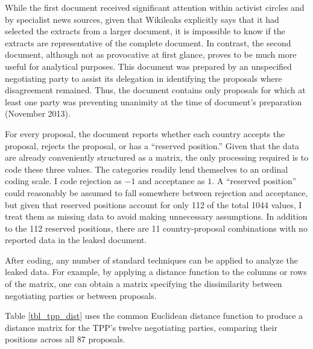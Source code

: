 \documentclass[12pt]{article}
\begin{document}
While the first document received significant 
attention within activist circles and by specialist news sources, given that Wikileaks 
explicitly says that it had selected the extracts from a larger document, it is impossible to know if the  
extracts are representative of the complete document. In contrast, the second document, although 
not as provocative at first glance, proves to be much more useful for 
analytical purposes. This document was prepared by an unspecified 
negotiating party to assist its delegation in identifying the proposals where disagreement remained. 
Thus, the document contains only proposals for which at least one party was preventing unanimity at 
the time of document's preparation (November 2013).

For every proposal, the document reports whether each country accepts the proposal, rejects the 
proposal, 
or has a ``reserved position.''	Given that the data are already conveniently structured as a matrix, 
the only processing required is to code these three values. The categories 
readily lend themselves to an ordinal coding scale. I code rejection as $-1$ and acceptance as 
$1$. A ``reserved position'' could reasonably be assumed to fall somewhere between rejection and acceptance, 
but given that reserved positions account for only 112 of the total 1044 values, I treat them as 
missing data to avoid making unnecessary assumptions. In addition to the 112 reserved positions, 
there are 11 country-proposal combinations with no reported data in the leaked document.

After coding, any number of standard techniques can be applied 
to analyze the leaked data. For example, by applying a distance function to the columns or rows of 
the matrix, one can obtain a matrix specifying the dissimilarity between negotiating 
parties or between proposals. 

Table \ref{tbl_tpp_dist} uses the common Euclidean distance function 
to produce a distance matrix for the TPP's twelve negotiating parties, comparing their positions across all 
87 proposals.
\end{document}
